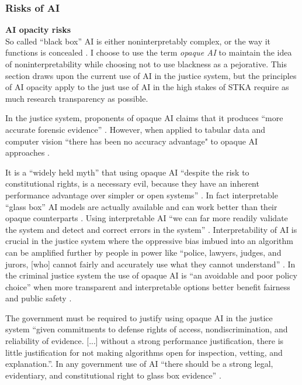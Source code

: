 \subsubsection{Risks of AI }
\textbf{AI opacity risks} \\
So called ``black box” AI is either noninterpretably complex, or the way it functions is concealed \citep[p. 1]{garrett_interpretable_2023}. I choose to use the term \textit{opaque AI} to maintain the idea of noninterpretability while choosing not to use blackness as a pejorative. This section draws upon the current use of AI in the justice system, but the principles of AI opacity apply to the just use of AI in the high stakes of STKA require as much research transparency as possible.

In the justice system, proponents of opaque AI claims that it produces “more accurate forensic evidence” \citep[p. 1]{garrett_interpretable_2023}. However, when applied to tabular data and computer vision ``there has been no accuracy advantage" to opaque AI approaches \citep[p. 8]{garrett_interpretable_2023}. 

It is a “widely held myth” that using opaque AI “despite the risk to constitutional rights, is a necessary evil, because they have an inherent performance advantage over simpler or open systems” \citep[p. 2]{garrett_interpretable_2023}. In fact interpretable “glass box” AI models are actually available and can work better than their opaque counterparts \citep[p. 4]{garrett_interpretable_2023}. Using interpretable AI “we can far more readily validate the system and detect and correct errors in the system” \citep[p. 4]{garrett_interpretable_2023}. Interpretability of AI is crucial in the justice system where the oppressive bias imbued into an algorithm \citep{noble_algorithms_2018} can be amplified further by people in power like “police, lawyers, judges, and jurors, [who] cannot fairly and accurately use what they cannot understand” \citep[p. 4]{garrett_interpretable_2023}. In the criminal justice system the use of opaque AI is “an avoidable and poor policy choice” when more transparent and interpretable options better benefit fairness and public safety \citep[p. 3]{garrett_interpretable_2023}. 

The government must be required to justify using opaque AI in the justice system “given commitments to defense rights of access, nondiscrimination, and reliability of evidence. [...] without a strong performance justification, there is little justification for not making algorithms open for inspection, vetting, and explanation.”\citep[p. 6]{garrett_interpretable_2023}. In any government use of AI “there should be a strong legal, evidentiary, and constitutional right to glass box evidence”  \citep[p. 6]{garrett_interpretable_2023}. 

